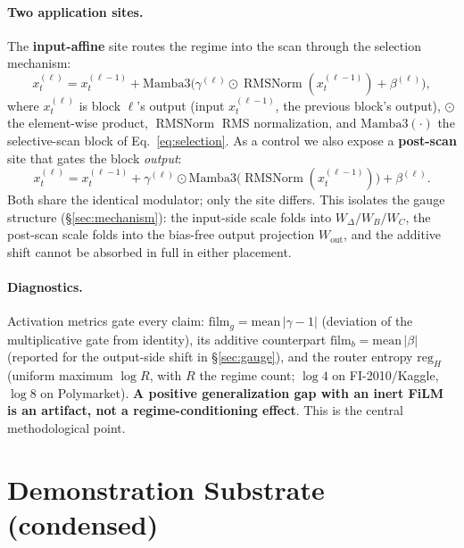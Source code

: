 \documentclass{article}
\DeclareMathOperator{\RMSNorm}{RMSNorm}
\begin{document}
\paragraph{Two application sites.}
The \textbf{input-affine} site routes the regime into the scan through the
selection mechanism:
\begin{equation}\label{eq:input}
x_t^{(\ell)}=x_t^{(\ell-1)}+\mathrm{Mamba3}\!\big(\gamma^{(\ell)}\odot\RMSNorm(x_t^{(\ell-1)})+\beta^{(\ell)}\big),
\end{equation}
where $x_t^{(\ell)}$ is block $\ell$'s output (input $x_t^{(\ell-1)}$, the previous block's output), $\odot$ the element-wise product, $\RMSNorm$ RMS normalization, and $\mathrm{Mamba3}(\cdot)$ the selective-scan block of Eq.~\eqref{eq:selection}.
As a control we also expose a \textbf{post-scan} site that gates the block
\emph{output}:
\begin{equation}\label{eq:postscan}
x_t^{(\ell)}=x_t^{(\ell-1)}+\gamma^{(\ell)}\odot\mathrm{Mamba3}\!\big(\RMSNorm(x_t^{(\ell-1)})\big)+\beta^{(\ell)}.
\end{equation}
Both share the identical modulator; only the site differs. This isolates the gauge
structure (\S\ref{sec:mechanism}): the input-side scale folds into
$W_\Delta/W_B/W_C$, the post-scan scale folds into the bias-free output projection
$W_{\text{out}}$, and the additive shift cannot be absorbed in full in either
placement.

\paragraph{Diagnostics.}
Activation metrics gate every claim:
$\mathrm{film}_g=\mathrm{mean}\,|\gamma-1|$ (deviation of the multiplicative gate
from identity), its additive counterpart $\mathrm{film}_b=\mathrm{mean}\,|\beta|$
(reported for the output-side shift in \S\ref{sec:gauge}), and the router entropy
$\mathrm{reg}_H$ (uniform maximum $\log R$, with $R$ the regime count; $\log 4$ on
FI-2010/Kaggle, $\log 8$ on Polymarket). \textbf{A positive generalization gap with an
inert FiLM is an artifact, not a regime-conditioning effect}. This is the central
methodological point.

\section{Demonstration Substrate (condensed)}\label{sec:substrate}
\end{document}
